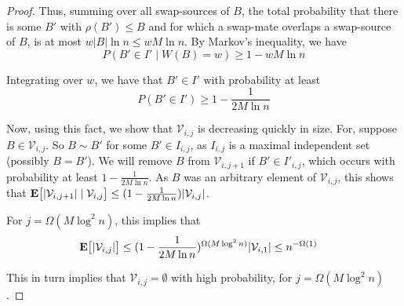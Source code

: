 \begin{proof}
Thus, summing over all swap-sources of $B$, the total probability that there is some $B'$ with $\rho(B') \leq B$ and for which a swap-mate overlaps a swap-source of $B$, is at most $w |B| \ln n \leq w M \ln n$. By Markov's inequality, we have
$$
P( B' \in I' \mid W(B) = w ) \geq 1 - w M \ln n
$$

Integrating over $w$, we have that $B' \in I'$ with probability at least
$$
P( B' \in I'  ) \geq 1 - \frac{1}{2 M \ln n}
$$

Now, using this fact, we show that $\mathcal V_{i,j}$ is decreasing quickly in size.  For, suppose $B \in \mathcal V_{i,j}$. So $B \sim B'$ for some $B' \in I_{i,j}$, as $I_{i,j}$ is a maximal independent set (possibly $B = B'$). We will remove $B$ from $\mathcal V_{i,j+1}$ if $B' \in I'_{i,j}$, which occurs with probability at least  $1 - \frac{1}{2 M \ln n}$. As $B$ was an arbitrary element of $\mathcal V_{i,j}$, this shows that $\mathbf{E}\bigl[|\mathcal V_{i,j+1}| \mid \mathcal V_{i,j}\bigr] \leq (1 - \frac{1}{2 M \ln n}) |\mathcal V_{i,j}|$. 

For $j = \Omega(M \log^2 n)$,  this implies that 
\begin{align*}
\mathbf{E}\bigl[ |\mathcal V_{i,j}| \bigr] &\leq  (1 - \frac{1}{2 M \ln n})^{\Omega(M \log^2 n)} |\mathcal V_{i,1}| \leq n^{-\Omega(1)}
\end{align*}

This in turn implies that $\mathcal V_{i,j} = \emptyset$ with high probability, for $j = \Omega( M \log^2 n )$.
\end{proof}

